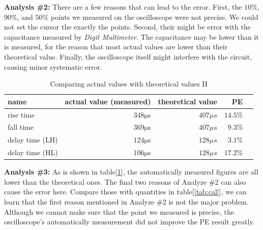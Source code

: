 \hfill \newline
\textbf{Analysis \#2:} \newline
\phantom{ } There are a few reasons that can lead to the error. First, the $10\%$, $90\%$, and $50\%$ points we measured on the oscilloscope were not precise. We could not set the cursor the exactly the points. Second, their might be error with the capacitance measured by \textit{Digit Multimeter}. The capacitance may be lower than it is measured, for the reason that most actual values are lower than their theoretical value. Finally, the oscilloscope itself might interfere with the circuit, causing minor systematic error.

\begin{table}[!htbp]
	\centering
	\caption{Comparing actual values with theoretical values II}
	\begin{tabular}{lrrrl}
		\toprule
		name & actual value (measured) & theoretical value & PE & \\
		\midrule
		rise time & $348\mathrm{\mu s}$ & ${407\mu s}$ & $14.5\%$ & \\
		fall time & $369\mathrm{\mu s}$ &  ${407\mu s}$ & $9.3\%$ & \\
		delay time (LH) & $124\mathrm{\mu s}$ & ${128\mu s}$ & $3.1\%$ & \\
		delay time (HL) & $106\mathrm{\mu s}$ &  ${128\mu s}$ & $17.2\%$ & \\
		\bottomrule
	\end{tabular}
	\label{tab:dir}
\end{table}

\hfill \newline
\textbf{Analysis \#3:} \newline
\phantom{ } As is shown in table[\ref{tab:dir}], the automatically measured figures are all lower than the theoretical ones. The final two reasons of Analyze \#2 can also cause the error here. Compare those with quantities in table[\ref{tab:cal}], we can learn that the first reason mentioned in Analyze \#2 is not the major problem. Although we cannot make sure that the point we measured is precise, the oscilloscope's automatically measurement did not improve the PE result greatly.\newline
